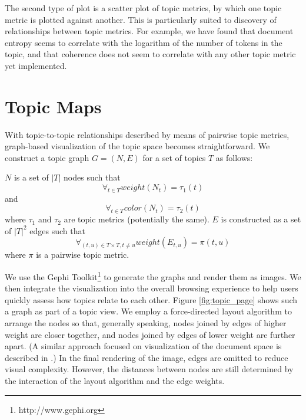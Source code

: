 \documentclass[11pt]{article}
\begin{document}
The second type of plot is a scatter plot of topic metrics, by which one topic
metric is plotted against another. This is particularly suited to discovery of
relationships between topic metrics. For example, we have found that document
entropy seems to correlate with the logarithm of the number of tokens in the
topic, and that coherence does not seem to correlate with any other topic metric
yet implemented.

\section{Topic Maps}\label{sec:maps}
With topic-to-topic relationships described by means of pairwise topic metrics,
graph-based visualization of the topic space becomes straightforward.  We
construct a topic graph $G = (N, E)$ for a set of topics $T$ as follows:

$N$ is a set of $|T|$ nodes such that
\[\forall_{t\in T} weight(N_{t}) = \tau_{1}(t)\]
and
\[\forall_{t\in T} color(N_{t}) = \tau_{2}(t)\]
where $\tau_1$ and $\tau_2$ are topic metrics (potentially the same). $E$ is
constructed as a set of $|T|^2$ edges such that
  \[\forall_{(t,u)\in T\times T, t\neq u} weight(E_{t,u}) = \pi(t,u)\]
where $\pi$ is a pairwise topic metric.

We use the Gephi Toolkit\footnote{http://www.gephi.org} to generate the graphs and
render them as images. We then integrate the visualization into the overall
browsing experience to help users quickly assess how topics relate to each
other. Figure \ref{fig:topic_page} shows such a graph as part of a topic view. 
We employ a force-directed layout algorithm to arrange
the nodes so that, generally speaking, nodes joined by edges of higher weight
are closer together, and nodes joined by edges of lower weight are further
apart. (A similar approach focused on visualization of the document space is
described in .) In the final rendering of the image, edges 
are omitted to reduce visual complexity. However, the distances between nodes %
are still determined by the interaction of the layout algorithm and the edge
weights.
\end{document}
